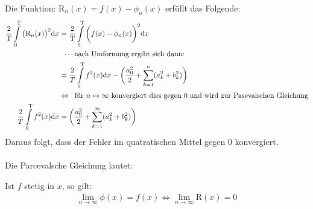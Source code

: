 Die Funktion: $ \mathrm{R}_n(x)=f(x) -\phi_n(x)$ erfüllt das Folgende:\\
\begin{align*}
\frac{2}{\mathrm{T}}\int\limits_{0}^{\mathrm{T}} \big(\mathrm{R}_n(x)\big)^2 \mathrm{d}x&=\frac{2}{\mathrm{T}}\int\limits_{0}^{\mathrm{T}} \bigg(f(x) -\phi_n(x)\bigg)^2 \mathrm{d}x\\
&\;\;\cdots\text{nach Umformung ergibt sich dann: }\\
&=\frac{2}{T}\int\limits_{0}^{\mathrm{T}} f^2(x)\mathrm{d}x-\bigg(\frac{a_0^2}{2}+\sum\limits_{k=1}^{n}(a^2_k+b^2_k)\bigg)\\
&\Leftrightarrow \;\;\text{für $ n\mapsto \infty  $ konvergiert dies gegen 0 und wird zur Pasevalschen Gleichung}\\
\frac{2}{T}\int\limits_{0}^{\mathrm{T}} f^2(x)\mathrm{d}x&=\bigg(\frac{a_0^2}{2}+\sum\limits_{k=1}^{\infty}(a^2_k+b^2_k)\bigg)\\
\end{align*}
Daraus folgt, dass der Fehler im quatratischen Mittel gegen 0 konvergiert.\\
\\
Die Parcevalsche Gleichung lautet:\\
\begin{center}
\end{center}
Ist $ f $ stetig in $ x $, so gilt:\\
\begin{align*}
\lim\limits_ {n\to\infty}\phi(x)=f(x)\Leftrightarrow\lim\limits_ {n\to\infty}\mathrm{R}(x)=0
\end{align*}
\newpage
\noindent

